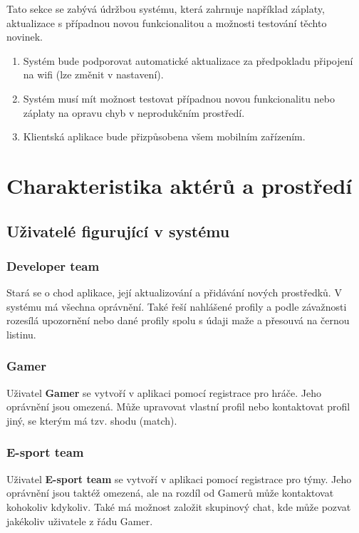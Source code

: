 \documentclass[czech,12pt,a4paper,titlepage]{article}
\begin{document}
Tato sekce se zabývá údržbou systému, která zahrnuje například záplaty, aktualizace s případnou
novou funkcionalitou a možnosti testování těchto novinek.

\begin{enumerate}
    \item Systém bude podporovat automatické aktualizace za předpokladu připojení na wifi (lze změnit v nastavení).
    \item Systém musí mít možnost testovat případnou novou funkcionalitu nebo záplaty na opravu chyb v neprodukčním prostředí.
    \item Klientská aplikace bude přizpůsobena všem mobilním zařízením.
\end{enumerate}

\section{Charakteristika aktérů a prostředí}

\subsection{Uživatelé figurující v systému}

\subsubsection*{Developer team}

Stará se o chod aplikace, její aktualizování a přidávání nových prostředků. V systému má
všechna oprávnění. Také řeší nahlášené profily a podle závažnosti rozesílá upozornění
nebo dané profily spolu s údaji maže a přesouvá na černou listinu.

\subsubsection*{Gamer}

Uživatel \textbf{Gamer} se vytvoří v aplikaci pomocí registrace pro hráče. Jeho oprávnění jsou
omezená. Může upravovat vlastní profil nebo kontaktovat profil jiný, se kterým má tzv. shodu (match).

\subsubsection*{E-sport team}

Uživatel \textbf{E-sport team} se vytvoří v aplikaci pomocí registrace pro týmy. Jeho oprávnění jsou
taktéž omezená, ale na rozdíl od Gamerů může kontaktovat kohokoliv kdykoliv. Také má možnost
založit skupinový chat, kde může pozvat jakékoliv uživatele z řádu Gamer.
\end{document}
